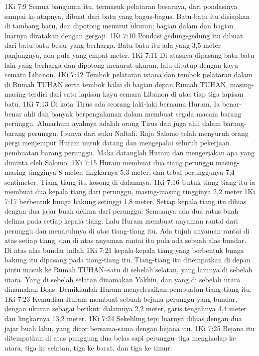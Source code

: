 1Ki 7:9  Semua bangunan itu, termasuk pelataran besarnya, dari pondasinya sampai ke atapnya, dibuat dari batu yang bagus-bagus. Batu-batu itu disiapkan di tambang batu, dan dipotong menurut ukuran; bagian dalam dan bagian luarnya diratakan dengan gergaji.
1Ki 7:10  Pondasi gedung-gedung itu dibuat dari batu-batu besar yang berharga. Batu-batu itu ada yang 3,5 meter panjangnya, ada pula yang empat meter.
1Ki 7:11  Di atasnya dipasang batu-batu lain yang berharga dan dipotong menurut ukuran, lalu ditutup dengan kayu cemara Libanon.
1Ki 7:12  Tembok pelataran istana dan tembok pelataran dalam di Rumah TUHAN serta tembok balai di bagian depan Rumah TUHAN, masing-masing terdiri dari satu lapisan kayu cemara Libanon di atas tiap tiga lapisan batu.
1Ki 7:13  Di kota Tirus ada seorang laki-laki bernama Huram. Ia benar-benar ahli dan banyak berpengalaman dalam membuat segala macam barang perunggu. Almarhum ayahnya adalah orang Tirus dan juga ahli dalam barang-barang perunggu. Ibunya dari suku Naftali. Raja Salomo telah menyuruh orang pergi menjemput Huram untuk datang dan mengepalai seluruh pekerjaan pembuatan barang perunggu. Maka datanglah Huram dan mengerjakan apa yang diminta oleh Salomo.
1Ki 7:15  Huram membuat dua tiang perunggu masing-masing tingginya 8 meter, lingkarnya 5,3 meter, dan tebal perunggunya 7,4 sentimeter. Tiang-tiang itu kosong di dalamnya.
1Ki 7:16  Untuk tiang-tiang itu ia membuat dua kepala tiang dari perunggu, masing-masing tingginya 2,2 meter
1Ki 7:17  berbentuk bunga bakung setinggi 1,8 meter. Setiap kepala tiang itu dihias dengan dua jajar buah delima dari perunggu. Semuanya ada dua ratus buah delima pada setiap kepala tiang. Lalu Huram membuat anyaman rantai dari perunggu dan menaruhnya di atas tiang-tiang itu. Ada tujuh anyaman rantai di atas setiap tiang, dan di atas anyaman rantai itu pula ada sebuah alas bundar. Di atas alas bundar inilah
1Ki 7:21  kepala-kepala tiang yang berbentuk bunga bakung itu dipasang pada tiang-tiang itu. Tiang-tiang itu ditempatkan di depan pintu masuk ke Rumah TUHAN--satu di sebelah selatan, yang lainnya di sebelah utara. Yang di sebelah selatan dinamakan Yakhin, dan yang di sebelah utara dinamakan Boas. Demikianlah Huram menyelesaikan pembuatan tiang-tiang itu.
1Ki 7:23  Kemudian Huram membuat sebuah bejana perunggu yang bundar, dengan ukuran sebagai berikut: dalamnya 2,2 meter, garis tengahnya 4,4 meter dan lingkarnya 13,2 meter.
1Ki 7:24  Sekeliling tepi luarnya dihias dengan dua jajar buah labu, yang dicor bersama-sama dengan bejana itu.
1Ki 7:25  Bejana itu ditempatkan di atas punggung dua belas sapi perunggu--tiga menghadap ke utara, tiga ke selatan, tiga ke barat, dan tiga ke timur.
